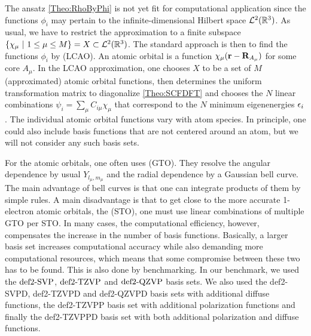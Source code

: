 The ansatz \eqref{Theo:RhoByPhi} is not yet fit for computational application since the
functions $\phi_i$ may pertain to the infinite-dimensional Hilbert space $\mathcal L^2(\mathbb{R}^3)$.
As usual, we have to restrict the approximation to a finite subspace 
$\left\{{\chi_\mu\ |\ 1 \le \mu \le M} \right\} = X \subset \mathcal L^2(\mathbb{R}^3)$.
The standard approach is then to find the functions $\phi_i$ by  (LCAO). An atomic orbital is a function $\chi_\mu(\mathbf{r} - \mathbf{R}_{A_\mu})$
for some core $A_\mu$. In the LCAO approximation, one chooses $X$ to be a set of $M$ (approximated) atomic orbital
functions, then determines the uniform transformation matrix to diagonalize \eqref{Theo:SCFDFT}
and chooses the $N$ linear combinations $\psi_i=\sum_\mu C_{i \mu} \chi_\mu$ that correspond to the $N$ minimum
eigenenergies $\epsilon_i$. The individual atomic orbital functions vary with atom species. In principle,
one could also include basis functions that are not centered around an atom, but we will
not consider any such basis sets.

For the atomic orbitals, one often uses  (GTO). They resolve the
angular dependence by usual  $Y_{l_\mu,m_\mu}$ and the
radial dependence by a Gaussian bell curve. The main advantage of bell curves is that one can integrate products
of them by simple rules. A main disadvantage
is that to get close to the more accurate 1-electron atomic orbitals, the 
(STO), one must use linear combinations of multiple GTO per STO. In many cases, the computational
efficiency, however, compensates the increase in the number of basis functions.
Basically, a larger basis set increases computational accuracy while also demanding more
computational resources, which means that some compromise between these two has to
be found. This is also done by benchmarking. In our benchmark, we used the
$\text{def2-SVP}$,\cite{SchaeferHornAhlrichs1992}
$\text{def2-TZVP}$\cite{WeigendHaeserPatzeltEtAl1998} and
$\text{def2-QZVP}$\cite{WeigendFurcheAhlrichs2003} basis sets. We also used the def2-SVPD,
def2-TZVPD and def2-QZVPD basis sets with additional diffuse
functions,\cite{RappoportFurche2010} the
def2-TZVPP\cite{WeigendHaeserPatzeltEtAl1998} basis set with additional
polarization functions and finally the def2-TZVPPD\cite{RappoportFurche2010}
basis set with both additional polarization and diffuse functions.

